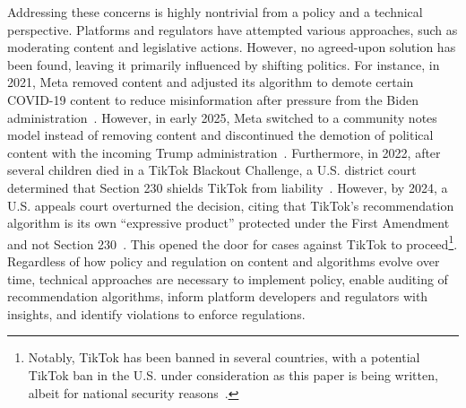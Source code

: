 Addressing these concerns is highly nontrivial from a policy and a technical perspective. Platforms and regulators have attempted various approaches, such as moderating content and legislative actions. However, no agreed-upon solution has been found, leaving it primarily influenced by shifting politics.
For instance, in 2021, Meta removed content and adjusted its algorithm to demote certain COVID-19 content to reduce misinformation after pressure from the Biden administration~\cite{Luciano2021Jul}. However, in early 2025, Meta switched to a community notes model instead of removing content and discontinued the demotion of political content with the incoming Trump administration~\cite{Meta2025}. Furthermore, in 2022, after several children died in a TikTok Blackout Challenge, a U.S. district court determined that Section 230 shields TikTok from liability~\cite{arstech-parents-sue-tiktok}. However, by 2024, a U.S. appeals court overturned the decision, citing that TikTok's recommendation algorithm is its own ``expressive product'' protected under the First Amendment and not Section 230~\cite{wsj-tiktok-section230}. This opened the door for cases against TikTok to proceed\footnote{Notably, TikTok has been banned in several countries, with a potential TikTok ban in the U.S. under consideration as this paper is being written, albeit for national security reasons~\cite{Gordon2024Apr}.}.
Regardless of how policy and regulation on content and algorithms evolve over time, technical approaches are necessary to implement policy, \ie enable auditing of recommendation algorithms, inform platform developers and regulators with insights, and identify violations to enforce regulations.  %


